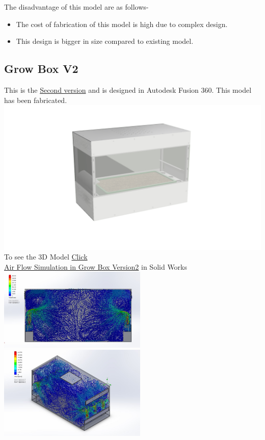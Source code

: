 \documentclass[a4paper,12pt,oneside]{book}
\begin{document}
The disadvantage of this model are as follows- 
\begin{itemize}
\item The cost of fabrication of this model is high due to complex design. 
\item This design is bigger in size compared to existing model.
\end{itemize}

\subsection{Grow Box V2}
This is the \href{https://www.youtube.com/watch?v=TTjnuqw7IV8}{Second version} and is designed in Autodesk Fusion 360. This model has been fabricated.\\
\includegraphics[width=400pt]{version2}\\
To see the 3D Model  \href{http://a360.co/2sLIiCD}{Click}\\
\href{https://www.youtube.com/watch?v=ab_HcFKEwkE}{Air Flow Simulation in Grow Box Version2} in Solid Works\\
\includegraphics[width=200pt]{version_2_FV}
\includegraphics[width=200pt]{version_2_ISO}
\end{document}
